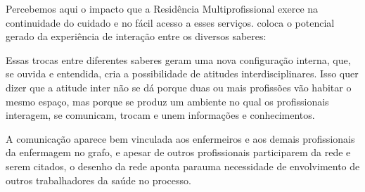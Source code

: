 Percebemos aqui o impacto que a Residência Multiprofissional exerce na continuidade do cuidado e no fácil acesso a esses serviços. \cite{maia2013atuaccao} coloca o potencial gerado da experiência de interação entre os diversos saberes:

Essas trocas entre diferentes saberes geram uma nova configuração interna, que, se ouvida e entendida, cria a possibilidade de atitudes interdisciplinares. Isso quer dizer que a atitude inter não se dá porque duas ou mais profissões vão habitar o mesmo espaço, mas porque se produz um ambiente no qual os profissionais interagem, se comunicam, trocam e unem informações e conhecimentos.

A comunicação aparece bem vinculada aos enfermeiros e aos demais profissionais da enfermagem no grafo, e apesar de outros profissionais participarem da rede e serem citados, o desenho da rede aponta parauma necessidade de envolvimento de outros trabalhadores da saúde no processo.